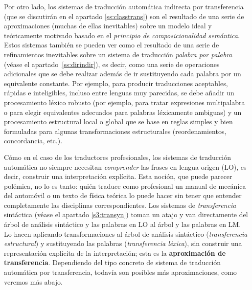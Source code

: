 Por otro lado, los sistemas de traducción automática indirecta por transferencia (que se discutirán en el apartado \ref{ss:classtrans}) son el resultado de una serie de aproximaciones (muchas de ellas inevitables) sobre un modelo ideal y teóricamente motivado basado en el \emph{principio de composicionalidad semántica}. Estos sistemas también se pueden ver como el resultado de una serie de refinamientos inevitables sobre un sistema de traducción \emph{palabra por palabra} (véase el apartado~\ref{ss:dirindir}), es decir, como una serie de operaciones adicionales que se debe realizar además de ir sustituyendo cada palabra por un equivalente constante. Por ejemplo, para producir traducciones aceptables, rápidas e inteligibles, incluso entre lenguas muy parecidas, se debe añadir un procesamiento léxico robusto (por ejemplo, para tratar expresiones multipalabra o para elegir equivalentes adecuados para palabras léxicamente ambiguas) y un procesamiento estructural local o global que se base en reglas simples y bien formuladas para algunas transformaciones estructurales (reordenamientos, concordancia, etc.). 

Cómo en el caso de los traductores profesionales, los sistemas de traducción automática no siempre necesitan \emph{comprender} las frases en lengua origen (LO), es decir, construir una interpretación explícita. Esta noción, que puede parecer polémica, no lo es tanto: quién traduce como profesional un manual de mecánica del automóvil o un texto de física teórica lo puede hacer sin tener que entender completamente las disciplinas correspondientes. Los sistemas de \emph{transferencia} sintáctica (véase el apartado \ref{s3:transyn}) toman un atajo y van directamente del árbol de análisis sintáctico y las palabras en LO al árbol y las palabras en LM. Lo hacen aplicando transformaciones al árbol de análisis sintáctico (\emph{transferencia estructural}) y sustituyendo las palabras (\emph{transferencia léxica}), sin construir una representación explícita de la interpretación; esta es la \textbf{aproximación de transferencia}. Dependiendo del tipo concreto de sistema de traducción automática por transferencia, todavía son posibles más aproximaciones, como veremos más abajo. 

